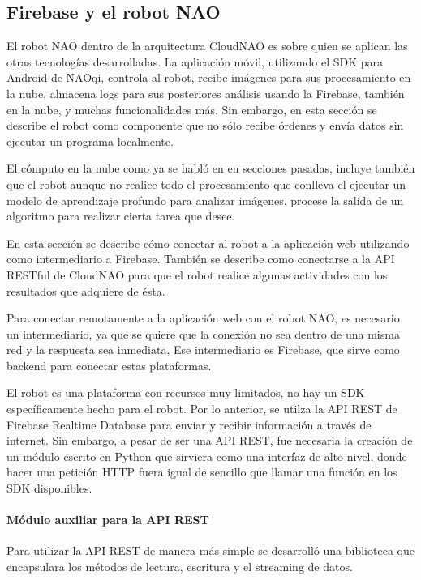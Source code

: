 \subsection{Firebase y el robot NAO}\label{\detokenize{firebase-nao-robot}}
El robot NAO dentro de la arquitectura CloudNAO es sobre quien se aplican las
otras tecnologías desarrolladas. La aplicación móvil, utilizando el SDK para Android de NAOqi,
controla al robot, recibe imágenes para sus procesamiento en la nube, almacena
logs para sus posteriores análisis usando la Firebase, también en la nube, y muchas
funcionalidades más. Sin embargo, en esta sección se describe el robot como componente
que no sólo recibe órdenes y envía datos sin ejecutar un programa localmente.

El cómputo en la nube como ya se habló en en secciones pasadas, incluye también
que el robot aunque no realice todo el procesamiento que conlleva el ejecutar
un modelo de aprendizaje profundo para analizar imágenes, procese la salida
de un algoritmo para realizar cierta tarea que desee.

En esta sección se describe cómo conectar al robot a la aplicación web utilizando
como intermediario a Firebase. También se describe como conectarse a la API RESTful
de CloudNAO para que el robot realice algunas actividades con los resultados
que adquiere de ésta.

Para conectar remotamente a la aplicación web con el robot NAO, es necesario
un intermediario, ya que se quiere que la conexión no sea dentro de una misma red
y la respuesta sea inmediata, Ese intermediario es Firebase, que sirve como
backend para conectar estas plataformas.

El robot es una plataforma con recursos muy limitados, no hay un SDK
específicamente hecho para el robot. Por lo anterior, se utilza la API REST
de Firebase Realtime Database para envíar y recibir información a través de
internet. Sin embargo, a pesar de ser una API REST, fue necesaria la creación
de un módulo escrito en Python que sirviera como una interfaz de alto nivel,
donde hacer una petición HTTP fuera igual de sencillo que llamar una función en
los SDK disponibles.


\paragraph{Módulo auxiliar para la API REST}
\label{\detokenize{nao_firebase:modulo-auxiliar-para-la-api-rest}}
Para utilizar la API REST de manera más simple se desarrolló una biblioteca
que encapsulara los métodos de lectura, escritura y el streaming de datos.

